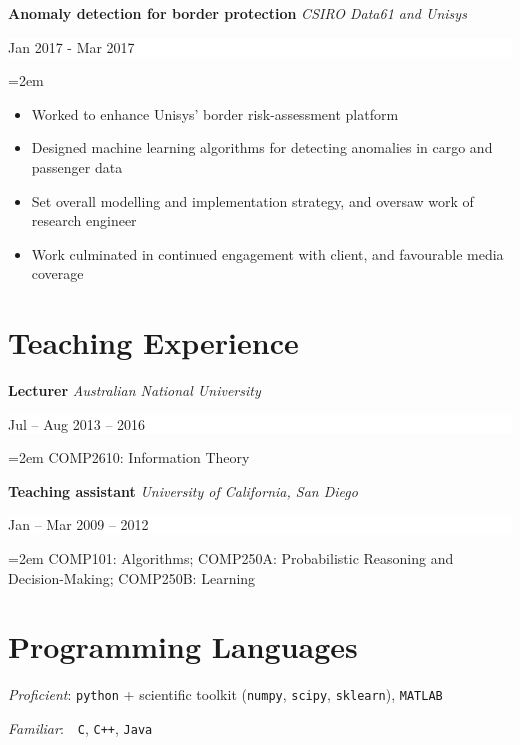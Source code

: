 \documentclass[fontsize=11pt]{article}
\newcommand{\NewPart}[1]{\section*{#1}}
\newcommand{\EducationEntry}[4]{
    \noindent \textbf{#1}
    \textit{#3}
    \hfill      %
    \colorbox{White}{
      \parbox{9em}{
      \hfill\color{Black}#2}} \par  %
    \noindent\hangindent=2em\hangafter=0 \small #4 %
    \normalsize \par}
\newcommand{\WorkEntry}[4]{       %
    \noindent
    \textbf{#1}
    \textit{#3} %
    \hfill      %
    \colorbox{White}{%
      \parbox{9em}{%
      \hfill\color{Black}#2}} \par   %
    \noindent\hangindent=2em\hangafter=0 \small #4 %
    \normalsize \par}
\begin{document}
\WorkEntry
{Anomaly detection for border protection}
{Jan 2017 - Mar 2017}
{CSIRO Data61 and Unisys}
{
\begin{itemize}
    \itemsep-0.1\baselineskip
    \item Worked to enhance Unisys' border risk-assessment platform
    \item Designed machine learning algorithms for detecting anomalies in cargo and passenger data
    \item Set overall modelling and implementation strategy, and oversaw work of research engineer
    \item Work culminated in continued engagement with client, and favourable media coverage
\end{itemize}
}


\NewPart{Teaching Experience}{}

\WorkEntry
{Lecturer}
{Jul -- Aug 2013 -- 2016}
{Australian National University}
{
    COMP2610: Information Theory
}


\WorkEntry
{Teaching assistant}
{Jan -- Mar 2009 -- 2012}
{University of California, San Diego}
{
    COMP101: Algorithms; COMP250A: Probabilistic Reasoning and Decision-Making; COMP250B: Learning
}

\NewPart{Programming Languages}{}

\emph{Proficient}: {{\tt python} + scientific toolkit ({\tt numpy}, {\tt scipy}, {\tt sklearn})},
{{\tt MATLAB}}

\noindent\emph{Familiar}: \,\ {\tt C}, {\tt C++}, {\tt Java}











\ 
\end{document}
